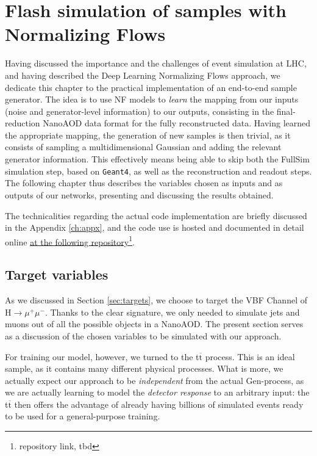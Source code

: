 \chapter{Flash simulation of samples with Normalizing Flows}\label{ch:fs} %

Having discussed the importance and the challenges of event simulation at LHC, and having described the Deep Learning Normalizing Flows approach, we dedicate this chapter to the practical implementation of an end-to-end sample generator.
The idea is to use NF models to \emph{learn} the mapping from our inputs (noise and generator-level information) to our outputs, consisting in the final-reduction NanoAOD data format for the fully reconstructed data. Having learned the appropriate mapping, the generation of new samples is then trivial, as it consists of sampling a multidimensional Gaussian and adding the relevant generator information. This effectively means being able to skip both the FullSim simulation step, based on \texttt{Geant4}, as well as the reconstruction and readout steps. The following chapter thus describes the variables chosen as inputs and as outputs of our networks, presenting and discussing the results obtained.

The technicalities regarding the actual code implementation are briefly discussed in the Appendix \ref{ch:appx}, and the code use is hosted and documented in detail online \href{tbd}{at the following repository}\footnote{repository link, tbd}.

\section{Target variables}

As we discussed in Section \ref{sec:targets}, we choose to target the VBF Channel of H$\rightarrow\mu^+\mu^-$. Thanks to the clear signature, we only needed to simulate jets and muons out of all the possible objects in a NanoAOD. The present section serves as a discussion of the chosen variables to be simulated with our approach.

For training our model, however, we turned to the t$\overline{\text{t}}$ process. This is an ideal sample, as it contains many different physical processes. What is more, we actually expect our approach to be \emph{independent} from the actual Gen-process, as we are actually learning to model the \emph{detector response} to an arbitrary input: the t$\overline{\text{t}}$ then offers the advantage of already having billions of simulated events ready to be used for a general-purpose training.

